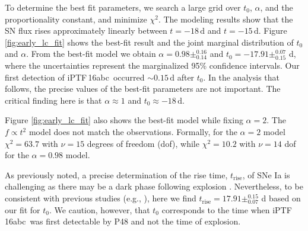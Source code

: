 \documentclass[twocolumn]{aastex61}
\newcommand{\abc}{iPTF\,16abc}
\begin{document}
To determine the best fit parameters, we search a large grid over $t_0$,
$\alpha$, and the proportionality constant, and minimize $\chi^2$. The
modeling results show that the SN flux rises approximately linearly between
$t=-18\,\mathrm{d}$ and $t=-15\,\mathrm{d}$. Figure \ref{fig:early_lc_fit}
shows the best-fit result and the joint marginal distribution of $t_0$ and
$\alpha$. From the best-fit model we obtain $\alpha=0.98 \pm ^{0.16}_{0.14}$
and $t_0=-17.91 \pm ^{0.07}_{0.15}$ d, where the uncertainties represent the
marginalized 95\% confidence intervals. Our first detection of \abc\ occurred
$\sim$${0.15}\,\textrm{d}$ after $t_0$. In the analysis that
follows, the precise values of the best-fit parameters are not important. The
critical finding here is that $\alpha \approx 1$ and $t_0 \approx -18 \,
\mathrm{d}$.

Figure \ref{fig:early_lc_fit} also shows the best-fit model while fixing
$\alpha = 2$. The $f \propto t^2$ model does not match the observations.
Formally, for the $\alpha = 2$ model $\chi^2 = 63.7$ with $\nu = 15$ degrees
of freedom (dof), while $\chi^2 = 10.2$ with $\nu = 14$ dof for the $\alpha =
0.98$ model.

As previously noted, a precise determination of the rise time,
$t_\mathrm{rise}$, of SNe Ia is challenging as there may be a dark phase
following explosion \citep{2014ApJ...784...85P}. Nevertheless, to be
consistent with previous studies (e.g., \citealt{2011MNRAS.416.2607G}), here
we find $t_\mathrm{rise} = 17.91\pm _{0.07}^{0.15}$ d based on our fit for
$t_0$. We caution, however, that $t_0$ corresponds to the time when \abc\ was first detectable by P48 and not the time of explosion.
\end{document}
